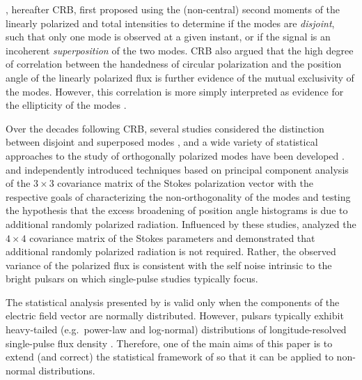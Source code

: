 \documentclass[twocolumn]{aastex6}
\begin{document}
\citet{crb78}, hereafter CRB, first proposed using the (non-central)
second moments of the linearly polarized and total intensities to
determine if the modes are \emph{disjoint}, such that only one mode is
observed at a given instant, or if the signal is an incoherent
\emph{superposition} of the two modes.
%
CRB also argued that the high degree of correlation between the
handedness of circular polarization and the position angle of the
linearly polarized flux is further evidence of the mutual exclusivity
of the modes.
%
However, this correlation is more simply interpreted as evidence for
the ellipticity of the modes \citep[e.g.][]{ht81,am82,kjk03}.


Over the decades following CRB, several studies considered the distinction
between disjoint and superposed modes \citep[e.g.][]{scr+84,ms98}, and
a wide variety of statistical approaches to the study of orthogonally
polarized modes have been developed
\citep[e.g.][]{ms00,mck02,mck03b,mck06}.
%
\citet{es04} and \citet{mck04} independently introduced techniques
based on principal component analysis of the $3\times3$ covariance
matrix of the Stokes polarization vector with the respective goals of
characterizing the non-orthogonality of the modes and testing the
hypothesis that the excess broadening of position angle histograms
\citep[first noted by][]{scr+84} is due to additional randomly
polarized radiation.
%
Influenced by these studies, \citet{van09} analyzed the $4\times4$
covariance matrix of the Stokes parameters and demonstrated that
additional randomly polarized radiation is not required.  Rather, the
observed variance of the polarized flux is consistent with the self
noise intrinsic to the bright pulsars on which single-pulse studies
typically focus.

The statistical analysis presented by \citet{van09} is valid only when
the components of the electric field vector are normally distributed.
%
However, pulsars typically exhibit heavy-tailed (e.g.\ power-law and
log-normal) distributions of longitude-resolved single-pulse flux
density \citep[e.g.][]{cjd03a,ovb+14}.
%
Therefore, one of the main aims of this paper is to extend (and
correct) the statistical framework of \citet{van09} so that it can be
applied to non-normal distributions.
\end{document}
